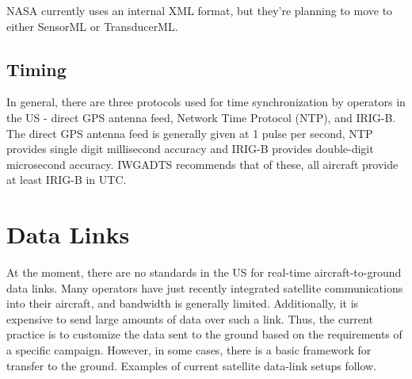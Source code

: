 NASA currently uses an internal XML format, but they're planning to move to either SensorML or TransducerML.  

% 
% 
% 
% 

\subsection{Timing}
%
In general, there are three protocols used for time synchronization by operators in the US - direct GPS antenna feed, Network Time Protocol (NTP), and IRIG-B.  The direct GPS antenna feed is generally given at 1 pulse per second, NTP provides single digit millisecond accuracy and IRIG-B provides double-digit microsecond accuracy.  IWGADTS recommends that of these, all aircraft provide at least IRIG-B in UTC.  


\section{Data Links}
%
At the moment, there are no standards in the US for real-time aircraft-to-ground data links.  Many operators have just recently integrated satellite communications into their aircraft, and bandwidth is generally limited.  Additionally, it is expensive to send large amounts of data over such a link.  Thus, the current practice is to customize the data sent to the ground based on the requirements of a specific campaign.  However, in some cases, there is a basic framework for transfer to the ground.  Examples of current satellite data-link setups follow.

